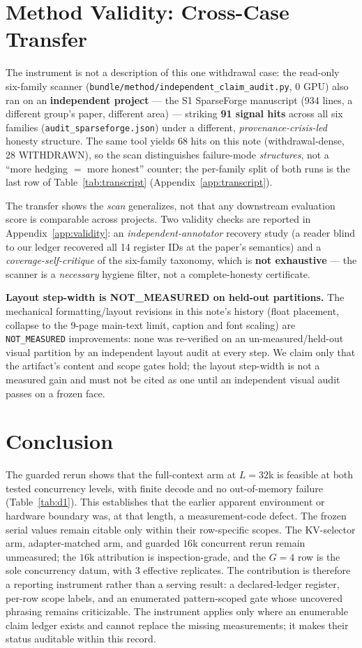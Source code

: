 \documentclass{article}
\newcommand{\zb}{\discretionary{}{}{}}
\newcommand{\code}[1]{\texttt{#1}}
\begin{document}
\section{Method Validity: Cross-Case Transfer}\label{sec:method}
The instrument is not a description of this one withdrawal case: the read-only six-family
scanner (\code{bundle/method/\zb independent\_claim\_audit.py}, 0 GPU) also ran on an
\textbf{independent project} --- the S1 SparseForge manuscript (934 lines, a different group's
paper, different area) --- striking \textbf{91 signal hits} across all six families
(\code{audit\_sparseforge.json}) under a different, \emph{provenance-crisis-led} honesty
structure. The same tool yields 68 hits on this note (withdrawal-dense, 28 WITHDRAWN), so the
scan distinguishes failure-mode \emph{structures}, not a ``more hedging $=$ more honest''
counter; the per-family split of both runs is the last row of
Table~\ref{tab:transcript} (Appendix~\ref{app:transcript}).

The transfer shows the \emph{scan} generalizes, not that any downstream evaluation score is
comparable across projects. Two validity checks are reported in
Appendix~\ref{app:validity}: an \emph{independent-annotator} recovery study (a reader blind to
our ledger recovered all 14 register IDs at the paper's semantics) and a
\emph{coverage-self-critique} of the six-family taxonomy, which is \textbf{not exhaustive} ---
the scanner is a \emph{necessary} hygiene filter, not a complete-honesty certificate.

\textbf{Layout step-width is NOT\_MEASURED on held-out partitions.} The mechanical
formatting/layout revisions in this note's history (float placement, collapse to the 9-page
main-text limit, caption and font scaling) are \texttt{NOT\_MEASURED} improvements: none was
re-verified on an un-measured/held-out visual partition by an independent layout audit at every
step. We claim only that the artifact's content and scope gates hold; the layout step-width is
not a measured gain and must not be cited as one until an independent visual audit passes on a
frozen face.

\section{Conclusion}\label{sec:concl}
The guarded rerun shows that the full-context arm at $L{=}32$k is feasible at both tested
concurrency levels, with finite decode and no out-of-memory failure
(Table~\ref{tab:d1}).  This establishes that the earlier apparent environment or hardware
boundary was, at that length, a measurement-code defect.  The frozen serial values remain
citable only within their row-specific scopes.  The KV-selector arm, adapter-matched arm,
and guarded $16$k concurrent rerun remain unmeasured; the $16$k attribution is
inspection-grade, and the $G{=}4$ row is the sole concurrency datum, with 3 effective
replicates.  The contribution is therefore a reporting instrument rather than a serving
result: a declared-ledger register, per-row scope labels, and an enumerated pattern-scoped
gate whose uncovered phrasing remains criticizable.  The instrument applies only where an
enumerable claim ledger exists and cannot replace the missing measurements; it makes their
status auditable within this record.
\end{document}
